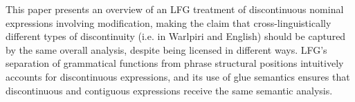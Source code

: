 This paper presents an overview of an LFG treatment of discontinuous nominal expressions involving modification, making the claim that cross-linguistically different types of discontinuity (i.e. in Warlpiri and English) should be captured by the same overall analysis, despite being licensed in different ways. LFG's separation of grammatical functions from phrase structural positions intuitively accounts for discontinuous expressions, and its use of glue semantics ensures that discontinuous and contiguous expressions receive the same semantic analysis.
